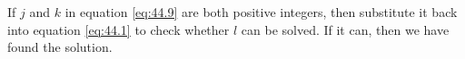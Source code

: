 If $j$ and $k$ in equation \eqref{eq:44.9} are both positive integers, then substitute it back into equation \eqref{eq:44.1} to check whether $l$ can be solved. If it can, then we have found the solution.







